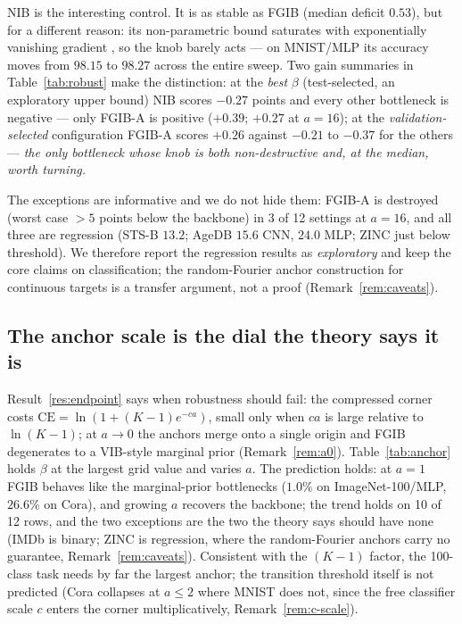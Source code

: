 \documentclass{article} %
\newcommand{\CE}{\mathrm{CE}}
\begin{document}
NIB is the interesting control. It is as stable as FGIB (median deficit $0.53$), but for
a different reason: its non-parametric bound saturates with exponentially vanishing
gradient \citep[\S IV A]{kolchinsky2019nib}, so the knob barely acts --- on MNIST/MLP
its accuracy moves from $98.15$ to $98.27$ across the entire sweep. Two gain summaries
in Table~\ref{tab:robust} make the distinction: at the \emph{best} $\beta$
(test-selected, an exploratory upper bound) NIB scores $-0.27$ points and every other
bottleneck is negative --- only FGIB-A is positive ($+0.39$; $+0.27$ at $a=16$); at the
\emph{validation-selected} configuration FGIB-A scores $+0.26$ against $-0.21$ to
$-0.37$ for the others --- \emph{the only bottleneck whose knob is both
non-destructive and, at the median, worth turning.}

The exceptions are informative and we do not hide them: FGIB-A is destroyed (worst case
$>5$ points below the backbone) in 3 of 12 settings at $a=16$, and all three are
regression (STS-B $13.2$; AgeDB $15.6$ CNN, $24.0$ MLP; ZINC just below threshold).
We therefore report the regression results as \emph{exploratory} and keep the core
claims on classification; the random-Fourier anchor construction for continuous
targets is a transfer argument, not a proof (Remark~\ref{rem:caveats}).

\subsection{The anchor scale is the dial the theory says it is}

Result~\ref{res:endpoint} says when robustness should fail: the compressed corner costs
$\CE = \ln(1+(K{-}1)e^{-ca})$, small only when $ca$ is large relative to
$\ln(K{-}1)$; at $a \to 0$ the anchors merge onto a single origin and FGIB degenerates
to a VIB-style marginal prior (Remark~\ref{rem:a0}). Table~\ref{tab:anchor} holds
$\beta$ at the largest grid value and varies $a$. The prediction holds: at $a=1$ FGIB
behaves like the marginal-prior bottlenecks ($1.0\%$ on ImageNet-100/MLP, $26.6\%$ on
Cora), and growing $a$ recovers the backbone; the trend holds on 10 of 12 rows, and
the two exceptions are the two the theory says should have none (IMDb is binary; ZINC
is regression, where the random-Fourier anchors carry no guarantee,
Remark~\ref{rem:caveats}). Consistent with the $(K{-}1)$ factor, the 100-class task
needs by far the largest anchor; the transition threshold itself is not predicted
(Cora collapses at $a \le 2$ where MNIST does not, since the free classifier scale $c$
enters the corner multiplicatively, Remark~\ref{rem:c-scale}).
\end{document}
